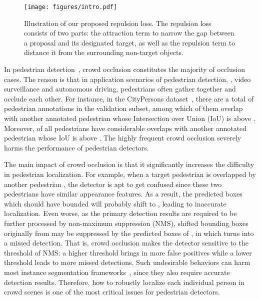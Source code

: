 \documentclass[10pt,twocolumn,letterpaper]{article}
\begin{document}
\begin{figure}[!htp]
\texttt{[image: figures/intro.pdf]}
\caption{Illustration of our proposed repulsion loss. The repulsion loss consists of two parts: the attraction term to narrow the gap between a proposal and its designated target, as well as the repulsion term to distance it from the surrounding non-target objects.}
\label{fig:intro}
\end{figure}

In pedestrian detection~\cite{zhang2016far,hosang2015taking,dollar2009integral,dollar2014fast,dollar2009pedestrian,mao2017can}, crowd occlusion constitutes the majority of occlusion cases. The reason is that in application scenarios of pedestrian detection, \eg, video surveillance and autonomous driving, pedestrians often gather together and occlude each other. For instance, in the CityPersons dataset~\cite{zhang2017citypersons}, there are a total of  pedestrian annotations in the validation subset, among which  of them overlap with another annotated pedestrian whose Intersection over Union (IoU) is above . Moreover,  of all pedestrians have considerable overlaps with another annotated pedestrian whose IoU is above . The highly frequent crowd occlusion severely harms the performance of pedestrian detectors.

The main impact of crowd occlusion is that it significantly increases the difficulty in pedestrian localization. For example, when a target pedestrian  is overlapped by another pedestrian , the detector is apt to get confused since these two pedestrians have similar appearance features. As a result, the predicted boxes which should have bounded  will probably shift to , leading to inaccurate localization. Even worse, as the primary detection results are required to be further processed by non-maximum suppression (NMS), shifted bounding boxes originally from  may be suppressed by the predicted boxes of , in which  turns into a missed detection. That is, crowd occlusion makes the detector sensitive to the threshold of NMS: a higher threshold brings in more false positives while a lower threshold leads to more missed detections. Such undesirable behaviors can harm most instance segmentation frameworks~\cite{he2017mask,li2017fully}, since they also require accurate detection results. Therefore, how to robustly localize each individual person in crowd scenes is one of the most critical issues for pedestrian detectors.
\end{document}
